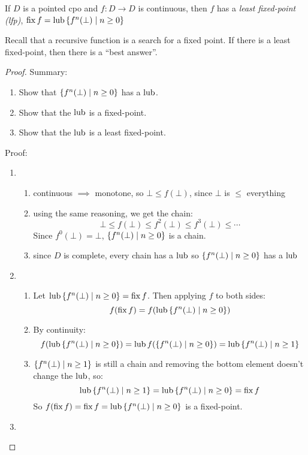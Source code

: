\documentclass{article}
\begin{document}
\newcommand{\fnset}[1][0]{\ensuremath{\set{f^n(\bot)\mid n\geq #1}}}

\begin{theorem}
  If $D$ is a pointed cpo and $f:D\rightarrow D$ is continuous, then $f$ has a \emph{least fixed-point (lfp)}, $\fix{f} = \lub{\fnset}$
\end{theorem}

\noindent Recall that a recursive function is a search for a fixed point. If
there is a least fixed-point, then there is a ``best answer''.

\begin{proof}
Summary:
\begin{enumerate}
  \item Show that $\fnset$ has a $\operatorname{lub}$.
  \item Show that the $\operatorname{lub}$ is a fixed-point.
  \item Show that the $\operatorname{lub}$ is a least fixed-point.
\end{enumerate}
Proof:
\begin{enumerate}
\item 
  \begin{enumerate}
    \item continuous $\implies$ monotone, so $\bot\leq f(\bot)$, since $\bot$
      is $\leq$ everything
    \item using the same reasoning, we get the chain:
      $$\bot\leq f(\bot)\leq f^2(\bot)\leq f^3(\bot)\leq\cdots$$
      Since $f^0(\bot) = \bot$, $\fnset$ is a chain.
    \item since $D$ is complete, every chain has a $\operatorname{lub}$ so $\fnset$ has a
      $\operatorname{lub}$
  \end{enumerate}
\item 
  \begin{enumerate}
  \item Let $\lub{\fnset} = \fix{f}$. Then applying $f$ to both sides:
    $$f(\fix f)=f(\lub{\fnset})$$
  \item By continuity:
    $$f(\lub{\fnset}) = \lub{f(\fnset)} = \lub{\fnset[1]}$$
  \item $\fnset[1]$ is still a chain and removing the bottom element doesn't
    change the $\operatorname{lub}$, so:
    $$\lub{\fnset[1]} = \lub{\fnset} = \fix{f}$$
    So $f(\fix{f}) = \fix{f}=\lub{\fnset}$ is a fixed-point.
  \end{enumerate}
\item

\end{enumerate}
\end{proof}
\end{document}
